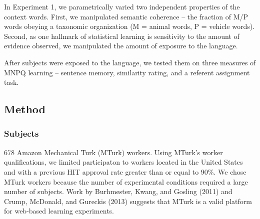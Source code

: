 \documentclass[man,floatsintext]{apa6}
\begin{document}
In Experiment 1, we parametrically varied two independent properties
of the context words. First, we manipulated semantic coherence -- the
fraction of M/P words obeying a taxonomic organization (M = animal
words, P = vehicle words). Second, as one hallmark of statistical
learning is sensitivity to the amount of evidence observed, we
manipulated the amount of exposure to the language.

After subjects were exposed to the language, we tested them on three
measures of MNPQ learning -- sentence memory, similarity rating, and a
referent assignment task.

\subsection{Method}

\subsubsection{Subjects} 678 Amazon Mechanical Turk (MTurk)
workers. Using MTurk's worker qualifications, we limited participaton
to workers located in the United States and with a previous HIT
approval rate greater than or equal to 90\%. We chose MTurk workers
because the number of experimental conditions required a large number
of subjects. Work by Burhmester, Kwang, and Gosling (2011) and Crump,
McDonald, and Gureckis (2013) suggests that MTurk is a valid platform
for web-based learning experiments.
\end{document}
